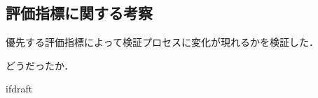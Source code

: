 \documentclass[11pt]{jsreport}
\begin{document}

\subsection{評価指標に関する考察}
優先する評価指標によって検証プロセスに変化が現れるかを検証した．



どうだったか．




\expandafter\ifx\csname ifdraft\endcsname\relax
  
\end{document}
